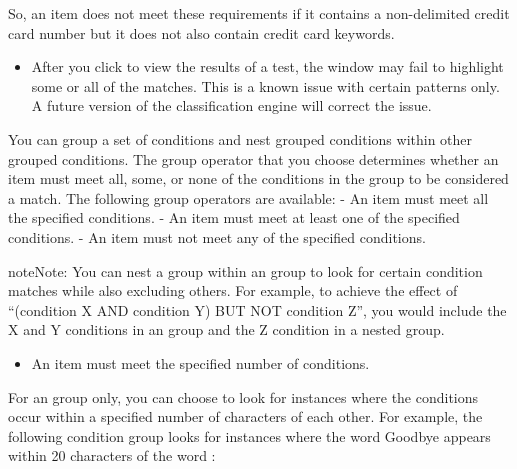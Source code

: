 \documentclass[letterpaper,10pt,english]{sphinxmanual}
\begin{document}
So, an item does not meet these requirements if it contains a non-delimited credit card number but it does not also contain credit card keywords.
\begin{itemize}
\item {} 
After you click  to view the results of a test, the  window may fail to highlight some or all of the matches. This is a known issue with certain patterns only. A future version of the classification engine will correct the issue.

\end{itemize}


You can group a set of conditions and nest grouped conditions within other grouped conditions. The group operator that you choose determines whether an item must meet all, some, or none of the conditions in the group to be considered a match.
The following group operators are available:
-  An item must meet all the specified conditions.
-  An item must meet at least one of the specified conditions.
-  An item must not meet any of the specified conditions.

\begin{sphinxadmonition}{note}{Note:}
You can nest a  group within an  group to look for certain condition matches while also excluding others. For example, to achieve the effect of “(condition X AND condition Y) BUT NOT condition Z”, you would include the X and Y conditions in an  group and the Z condition in a nested  group.
\end{sphinxadmonition}
\begin{itemize}
\item {} 
 An item must meet the specified number of conditions.

\end{itemize}

For an  group only, you can choose to look for instances where the conditions occur within a specified number of characters of each other. For example, the following condition group looks for instances where the word Goodbye appears within 20 characters of the word :

\begin{figure}[htbp]
\centering

\noindent{}
\end{figure}
\end{document}
